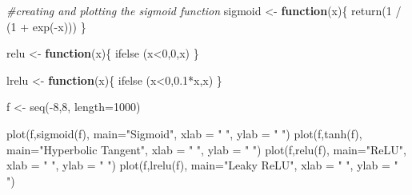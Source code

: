 \documentclass[
]{article}
\newenvironment{Shaded}{\begin{snugshade}}{\end{snugshade}}
\newcommand{\AttributeTok}[1]{\textcolor[rgb]{0.77,0.63,0.00}{#1}}
\newcommand{\CommentTok}[1]{\textcolor[rgb]{0.56,0.35,0.01}{\textit{#1}}}
\newcommand{\ControlFlowTok}[1]{\textcolor[rgb]{0.13,0.29,0.53}{\textbf{#1}}}
\newcommand{\DecValTok}[1]{\textcolor[rgb]{0.00,0.00,0.81}{#1}}
\newcommand{\FloatTok}[1]{\textcolor[rgb]{0.00,0.00,0.81}{#1}}
\newcommand{\FunctionTok}[1]{\textcolor[rgb]{0.00,0.00,0.00}{#1}}
\newcommand{\NormalTok}[1]{#1}
\newcommand{\OtherTok}[1]{\textcolor[rgb]{0.56,0.35,0.01}{#1}}
\newcommand{\SpecialCharTok}[1]{\textcolor[rgb]{0.00,0.00,0.00}{#1}}
\newcommand{\StringTok}[1]{\textcolor[rgb]{0.31,0.60,0.02}{#1}}
\begin{document}
\begin{Shaded}
\begin{Highlighting}[]
\CommentTok{\#creating and plotting the sigmoid function}
\NormalTok{sigmoid }\OtherTok{\textless{}{-}} \ControlFlowTok{function}\NormalTok{(x)\{}
  \FunctionTok{return}\NormalTok{(}\DecValTok{1} \SpecialCharTok{/}\NormalTok{ (}\DecValTok{1} \SpecialCharTok{+} \FunctionTok{exp}\NormalTok{(}\SpecialCharTok{{-}}\NormalTok{x)))}
\NormalTok{\}}

\NormalTok{relu }\OtherTok{\textless{}{-}} \ControlFlowTok{function}\NormalTok{(x)\{}
  \FunctionTok{ifelse}\NormalTok{ (x}\SpecialCharTok{\textless{}}\DecValTok{0}\NormalTok{,}\DecValTok{0}\NormalTok{,x) }
\NormalTok{\}}

\NormalTok{lrelu }\OtherTok{\textless{}{-}} \ControlFlowTok{function}\NormalTok{(x)\{}
  \FunctionTok{ifelse}\NormalTok{ (x}\SpecialCharTok{\textless{}}\DecValTok{0}\NormalTok{,}\FloatTok{0.1}\SpecialCharTok{*}\NormalTok{x,x) }
\NormalTok{\}}

\NormalTok{f }\OtherTok{\textless{}{-}} \FunctionTok{seq}\NormalTok{(}\SpecialCharTok{{-}}\DecValTok{8}\NormalTok{,}\DecValTok{8}\NormalTok{, }\AttributeTok{length=}\DecValTok{1000}\NormalTok{)}

\FunctionTok{plot}\NormalTok{(f,}\FunctionTok{sigmoid}\NormalTok{(f), }\AttributeTok{main=}\StringTok{"Sigmoid"}\NormalTok{, }\AttributeTok{xlab =} \StringTok{" "}\NormalTok{, }\AttributeTok{ylab =} \StringTok{" "}\NormalTok{)}
\FunctionTok{plot}\NormalTok{(f,}\FunctionTok{tanh}\NormalTok{(f), }\AttributeTok{main=}\StringTok{"Hyperbolic Tangent"}\NormalTok{, }\AttributeTok{xlab =} \StringTok{" "}\NormalTok{, }\AttributeTok{ylab =} \StringTok{" "}\NormalTok{)}
\FunctionTok{plot}\NormalTok{(f,}\FunctionTok{relu}\NormalTok{(f), }\AttributeTok{main=}\StringTok{"ReLU"}\NormalTok{, }\AttributeTok{xlab =} \StringTok{" "}\NormalTok{, }\AttributeTok{ylab =} \StringTok{" "}\NormalTok{)}
\FunctionTok{plot}\NormalTok{(f,}\FunctionTok{lrelu}\NormalTok{(f), }\AttributeTok{main=}\StringTok{"Leaky ReLU"}\NormalTok{, }\AttributeTok{xlab =} \StringTok{" "}\NormalTok{, }\AttributeTok{ylab =} \StringTok{" "}\NormalTok{)}
\end{Highlighting}
\end{Shaded}
\end{document}
